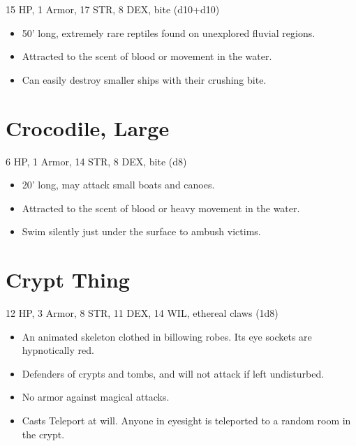 \documentclass[
  10pt,
  american,
]{article}
\begin{document}
15 HP, 1 Armor, 17 STR, 8 DEX, bite (d10+d10)

\begin{samepage}
\begin{itemize}
\setlength\itemsep{-.5em}
\item 50’ long, extremely rare reptiles found on unexplored fluvial regions.
\item Attracted to the scent of blood or movement in the water.
\item Can easily destroy smaller ships with their crushing bite.
\end{itemize}
\end{samepage}

\hypertarget{crocodile-large}{%
\section{Crocodile, Large}\label{crocodile-large}}

6 HP, 1 Armor, 14 STR, 8 DEX, bite (d8)

\begin{samepage}
\begin{itemize}
\setlength\itemsep{-.5em}
\item 20’ long, may attack small boats and canoes.
\item Attracted to the scent of blood or heavy movement in the water.
\item Swim silently just under the surface to ambush victims.
\end{itemize}
\end{samepage}

\hypertarget{crypt-thing}{%
\section{Crypt Thing}\label{crypt-thing}}

12 HP, 3 Armor, 8 STR, 11 DEX, 14 WIL, ethereal claws (1d8)

\begin{samepage}
\begin{itemize}
\setlength\itemsep{-.5em}
\item An animated skeleton clothed in billowing robes. Its eye sockets are hypnotically red.
\item Defenders of crypts and tombs, and will not attack if left undisturbed.
\item No armor against magical attacks.
\item Casts Teleport at will. Anyone in eyesight is teleported to a random room in the crypt.
\end{itemize}
\end{samepage}
\end{document}

